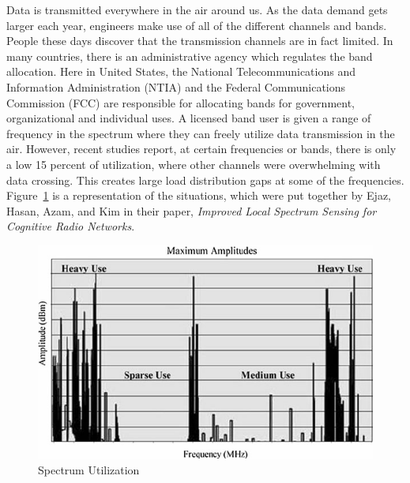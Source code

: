 
Data is transmitted everywhere in the air around us. As the data demand gets larger each year, engineers make use of all of the different 
channels and bands. People these days discover that the transmission channels are in fact limited. In many countries, there is an administrative
agency which regulates the band allocation. Here in United States, the National Telecommunications and Information Administration 
(NTIA) and the Federal Communications Commission (FCC) are responsible for allocating bands for government, organizational and
individual uses. A licensed band user is given a range of frequency in the spectrum where they can freely utilize data transmission
in the air. However, recent studies report, at certain frequencies or bands, there is only a low 15 percent of utilization, where other
channels were overwhelming with data crossing. This creates large load distribution gaps at some of the frequencies. Figure~\ref{fig:spectrum_utilization} is a representation of the situations, which were put together by Ejaz, Hasan, Azam, and Kim in their paper, \textit{Improved Local Spectrum Sensing for Cognitive Radio Networks}.

\begin{figure}[ht]
\centering
\includegraphics[width=12cm]{figures/spectrum_utilization.png}
\caption{Spectrum Utilization \cite{improved_local}}
\label{fig:spectrum_utilization}
\end{figure}

